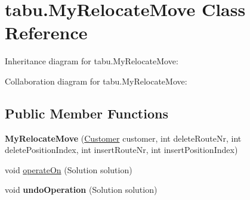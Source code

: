 \hypertarget{classtabu_1_1_my_relocate_move}{}\section{tabu.\+My\+Relocate\+Move Class Reference}
\label{classtabu_1_1_my_relocate_move}


Inheritance diagram for tabu.\+My\+Relocate\+Move\+:


Collaboration diagram for tabu.\+My\+Relocate\+Move\+:
\subsection*{Public Member Functions}
\begin{DoxyCompactItemize}
\item 
{\bfseries My\+Relocate\+Move} (\hyperlink{classsvrptw_1_1_customer}{Customer} customer, int delete\+Route\+Nr, int delete\+Position\+Index, int insert\+Route\+Nr, int insert\+Position\+Index)\hypertarget{classtabu_1_1_my_relocate_move_aa1d94b725c3a57f1deb66c7a6690e50f}{}\label{classtabu_1_1_my_relocate_move_aa1d94b725c3a57f1deb66c7a6690e50f}

\item 
void \hyperlink{classtabu_1_1_my_relocate_move_a4e029c06975414d259060beecd7146cd}{operate\+On} (Solution solution)
\item 
void {\bfseries undo\+Operation} (Solution solution)\hypertarget{classtabu_1_1_my_relocate_move_a982abf9fc3b4258f5ba3df601c72ad0b}{}\label{classtabu_1_1_my_relocate_move_a982abf9fc3b4258f5ba3df601c72ad0b}


\end{DoxyCompactItemize}
